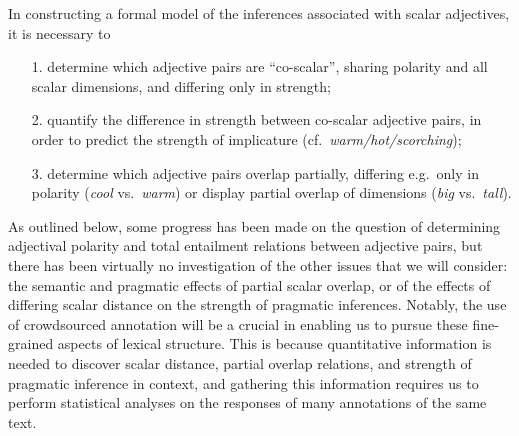 \documentclass[10pt]{article}
\begin{document}
In constructing a formal model of the inferences associated with scalar adjectives, it is necessary to  \begin{itemize}
\item [1.] determine which adjective pairs are ``co-scalar'', sharing polarity and all scalar dimensions, and differing only in strength;
\item [2.]quantify the difference in strength between co-scalar adjective pairs, in order to predict the strength of implicature (cf.\ \emph{warm/hot/scorching});
\item [3.]determine which adjective pairs overlap partially, differing e.g.\ only in polarity (\emph{cool} vs.\ \emph{warm}) or display partial overlap of dimensions (\emph{big} vs.\ \emph{tall}).
\end{itemize}
As outlined below, some progress has been made on the question of determining adjectival polarity and total entailment relations between adjective pairs, but there has been virtually no investigation of the other issues that we will consider: the semantic and pragmatic effects of partial scalar overlap, or of the effects of differing scalar distance on the strength of pragmatic inferences. Notably, the use of crowdsourced annotation will be a crucial in enabling us to pursue these fine-grained aspects of lexical structure. This is because quantitative information is needed to discover scalar distance, partial overlap relations, and strength of pragmatic inference in context, and gathering this information requires us to perform statistical analyses on the responses of many annotations of the same text. 
\end{document}
